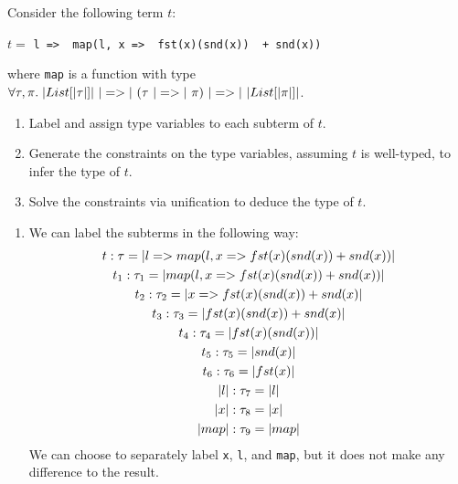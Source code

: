 
\begin{exercise}{}
  Consider the following term \(t\):
  \begin{center}
    \(t = \) \lstinline{l =>  map(l, x =>  fst(x)(snd(x))  + snd(x))}
  \end{center}

  where \lstinline|map| is a function with type \(\forall \tau, \pi.\;
  \alist{\tau} ~\ato~ (\tau ~\ato~ \pi) ~\ato~ \alist{\pi}\).

  \begin{enumerate}
    \item Label and assign type variables to each subterm of \(t\).
    \item Generate the constraints on the type variables, assuming \(t\) is
    well-typed, to infer the type of \(t\).
    \item Solve the constraints via unification to deduce the type of \(t\).
  \end{enumerate}
  
  \begin{solution}
    \begin{enumerate}
      \item We can label the subterms in the following way:
      \begin{gather}
        t: \tau = \lstinline|l =>  map(l, x =>  fst(x)(snd(x))  + snd(x))| \\
        t_1: \tau_1 = \lstinline|map(l, x =>  fst(x)(snd(x))  + snd(x))| \\
        t_2: \tau_2 = \lstinline|x =>  fst(x)(snd(x))  + snd(x)| \\
        t_3: \tau_3 = \lstinline|fst(x)(snd(x)) + snd(x)| \\
        t_4: \tau_4 = \lstinline|fst(x)(snd(x))| \\
        t_5: \tau_5 = \lstinline|snd(x)| \\
        t_6: \tau_6 = \lstinline|fst(x)| \\
        \lstinline|l|: \tau_7 = \lstinline|l| \\
        \lstinline|x|: \tau_8 = \lstinline|x| \\
        \lstinline|map|: \tau_9 = \lstinline|map|
      \end{gather}
      We can choose to separately label \lstinline|x|, \lstinline|l|, and
      \lstinline|map|, but it does not make any difference to the result.


\end{enumerate}
\end{solution}
\end{exercise}
